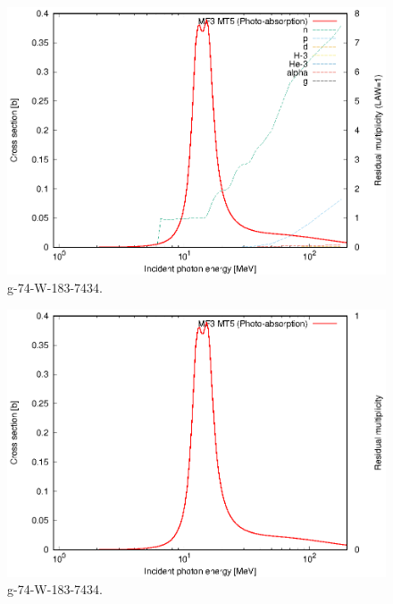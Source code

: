\begin{figure}
 \includegraphics[width=\linewidth]{eps/g_74-W-183_7434.eps}
  \caption{g-74-W-183-7434.}
\end{figure}
\begin{figure}
 \includegraphics[width=\linewidth]{eps-law0/g_74-W-183_7434.eps}
 \caption{g-74-W-183-7434.}
\end{figure}
\newpage \clearpage


